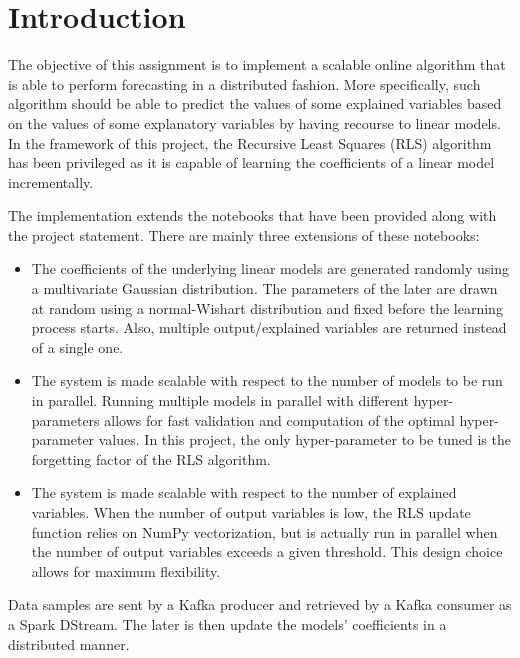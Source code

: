 \chapter{Introduction}

The objective of this assignment is to implement a scalable online algorithm
that is able to perform forecasting in a distributed fashion.
More specifically, such algorithm should be able to predict the values of
some explained variables based on the values of some explanatory variables
by having recourse to linear models. In the framework of this project,
the Recursive Least Squares (RLS) algorithm has been privileged as it is
capable of learning the coefficients of a linear model incrementally.

The implementation extends the notebooks that have been provided
along with the project statement. There are mainly three extensions of these
notebooks:
\begin{itemize}
    \item The coefficients of the underlying linear models are generated randomly
        using a multivariate Gaussian distribution. The parameters of the later
        are drawn at random using a normal-Wishart distribution and fixed
        before the learning process starts.
        Also, multiple output/explained variables are returned instead of a single
        one.
    \item The system is made scalable with respect to the number of models to be
        run in parallel. Running multiple models in parallel with different
        hyper-parameters allows for fast validation and computation of the
        optimal hyper-parameter values. In this project, the only hyper-parameter
        to be tuned is the forgetting factor of the RLS algorithm.
    \item The system is made scalable with respect to the number of explained
        variables. When the number of output variables is low, the RLS update
        function relies on NumPy vectorization, but is actually run in parallel
        when the number of output variables exceeds a given threshold.
        This design choice allows for maximum flexibility.
\end{itemize}

Data samples are sent by a Kafka producer and retrieved by a Kafka consumer
as a Spark DStream. The later is then update the models' coefficients
in a distributed manner. 
